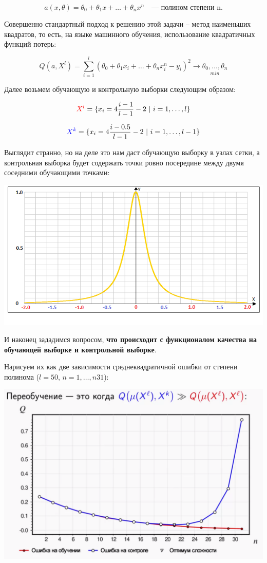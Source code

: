 \documentclass{article}
\begin{document}
$$a(x, \theta) = \theta_0 + \theta_1 x + \ldots + \theta_n x^n
\quad\text{--- полином степени n.}$$

Совершенно стандартный подход к решению этой задачи -- метод наименьших квадратов, то есть, на языке машинного обучения, использование квадратичных функций потерь:

$$Q(a, X^l) =
\sum\limits_{i = 1}^l (\theta_0 + \theta_1 x_i + \ldots + \theta_n x_i^n - y_i)^2
\rightarrow \underset{min}{\theta_0,\ldots,\theta_n}$$

Далее возьмем обучающую и контрольную выборки следующим образом:

$$\textcolor{red}{X^l} = \{x_i = 4\frac{i - 1}{l - 1} - 2\ |\ i = 1,\ldots, l\}$$

$$\textcolor{blue}{X^k} = \{x_i = 4\frac{i - 0.5}{l - 1} - 2\ |\ i = 1,\ldots, l - 1\}$$

Выглядит странно, но на деле это нам даст обучающую выборку в узлах сетки, а контрольная выборка будет содержать точки ровно посередине между двумя соседними обучающими точками:

\begin{center}
    \includegraphics[scale=0.8]{images/2_3.png}
\end{center}

И наконец зададимся вопросом, \textbf{что происходит с функционалом качества на обучающей выборке и контрольной выборке}.

Нарисуем их как две зависимости среднеквадратичной ошибки от степени полинома ($l = 50$, $n = 1,\ldots,n31$):

\begin{center}
    \includegraphics[scale=0.4]{images/2_4.png}
\end{center}
\end{document}
